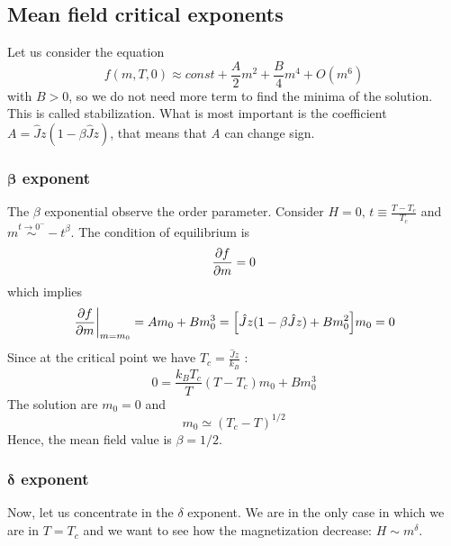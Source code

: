 \documentclass[../main/main.tex]{subfiles}
\begin{document}
\subsection{Mean field critical exponents}

Let us consider the equation
\begin{equation*}
  f (m,T,0) \approx const + \frac{A}{2} m^2 + \frac{B}{4} m^4 + O(m^6)
\end{equation*}
with \( B>0 \), so we do not need more term to find the minima of the solution. This is called stabilization. What is most important is  the coefficient \( A = \hat{J} z (1- \beta \hat{J} z ) \), that means that  \emph{A} can change sign.

\subsubsection{\( \pmb{\beta}  \) exponent}
The \( \beta  \) exponential observe the order parameter. Consider \( H=0,\, t \equiv \frac{T-T_c}{T_c} \) and \( m \overset{t \rightarrow 0^-}{\sim } -t^ \beta  \). The condition of equilibrium is
\begin{equation*}
  \pdv{f}{m}=0
\end{equation*}
which implies
\begin{equation*}
  \eval{\pdv{f}{m} }_{m=m_0} = A m_0 + B m_0^3 = \qty[ \hat{J} z ( 1- \beta \hat{J} z ) + B m_0^2]m_0 = 0
\end{equation*}
Since at the critical point we have \( T_c = \frac{\hat{J}z }{k_B } \) :
\begin{equation*}
  0 = \frac{k_B T_c}{T} (T-T_c) m_0 + B m_0^3
\end{equation*}
The solution are \( m_0=0 \) and
\begin{equation}
  m_0 \simeq (T_c-T)^{1/2}
\end{equation}
Hence, the mean field value is \( \beta =1/2 \).

\subsubsection{\( \pmb{\delta}  \) exponent}
Now, let us concentrate in the \( \delta  \) exponent. We are in the only case in which we are in \( T = T_c \) and we want to see how the magnetization decrease: \(  H \sim m^ \delta \).
\end{document}
